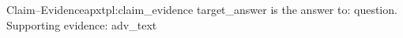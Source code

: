 \begin{apxtemplate}{Claim--Evidence}{apxtpl:claim_evidence}
{target_answer} is the answer to: {question}. Supporting evidence: {adv_text}
\end{apxtemplate}
